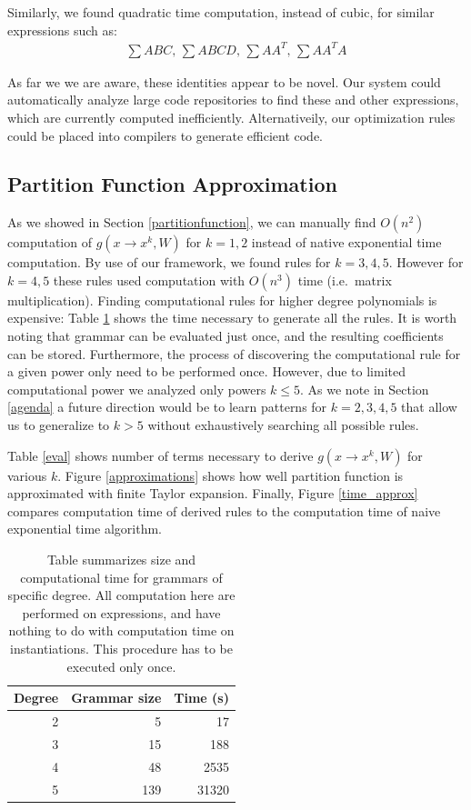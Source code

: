 Similarly, we found quadratic time computation, instead of cubic, for
similar expressions such as: 
\begin{align*}
	\sum ABC\text{, }\sum ABCD\text{, }\sum AA^T\text{, }\sum AA^TA
\end{align*}

As far we we are aware, these identities appear to be novel. Our
system could automatically analyze large code repositories to find
these and other expressions, which are currently computed
inefficiently. Alternativeily, our optimization rules could be placed
into compilers to generate efficient code.

\subsection{Partition Function Approximation}

As we showed in Section \ref{partitionfunction}, we can manually find
$O(n^2)$ computation of $g(x \rightarrow x^k, W)$ for $k = 1, 2$
instead of native exponential time computation. By use of our
framework, we found rules for $k = 3, 4, 5$. However for $k = 4, 5$
these rules used computation with $O(n^3)$ time (i.e.~matrix
multiplication).  Finding computational rules for higher degree
polynomials is expensive: Table \ref{grammars} shows the time
necessary to generate all the rules. It is worth noting that grammar
can be evaluated just once, and the resulting coefficients can be
stored. Furthermore, the process of discovering the computational rule
for a given power only need to be performed once. However, due to limited computational
power we analyzed only powers $k \leq 5$. As we note in Section
\ref{agenda} a future direction would be to learn patterns for
$k=2,3,4,5$ that allow us to generalize to $k>5$ without exhaustively
searching all possible rules. 

Table \ref{eval} shows number of terms necessary to derive $g(x
\rightarrow x^k, W)$ for various $k$. Figure \ref{approximations} shows
how well partition function is approximated with finite Taylor
expansion. Finally, Figure \ref{time_approx} compares computation time
of derived rules to the computation time of naive exponential time
algorithm.

\begin{table}
\tiny
\centering
\begin{tabular}{rrr}
\hline
Degree & Grammar size & Time (s) \\
\hline
2 & 5 & 17 \\
3 & 15 & 188 \\
4 & 48 & 2535\\
5 & 139 & 31320 \\
\hline
\end{tabular}
\caption{Table summarizes size and computational time for grammars of specific degree. 
All computation here are performed on expressions, and have nothing to do with computation time on instantiations.
This procedure has to be executed only once.}
\label{grammars}
\end{table}

